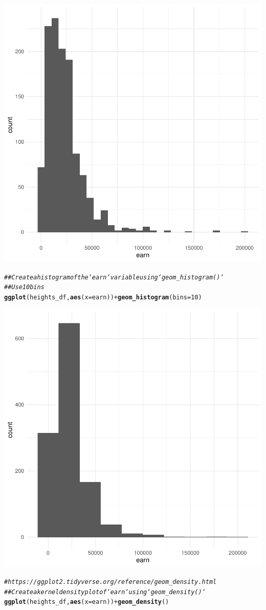 \documentclass{article}\usepackage[]{graphicx}\usepackage[]{xcolor}
\makeatletter
\newcommand{\hlnum}[1]{\textcolor[rgb]{0.686,0.059,0.569}{#1}}%
\newcommand{\hlcom}[1]{\textcolor[rgb]{0.678,0.584,0.686}{\textit{#1}}}%
\newcommand{\hlopt}[1]{\textcolor[rgb]{0,0,0}{#1}}%
\newcommand{\hlstd}[1]{\textcolor[rgb]{0.345,0.345,0.345}{#1}}%
\newcommand{\hlkwc}[1]{\textcolor[rgb]{0.333,0.667,0.333}{#1}}%
\newcommand{\hlkwd}[1]{\textcolor[rgb]{0.737,0.353,0.396}{\textbf{#1}}}%
\newenvironment{kframe}{%
 \def\at@end@of@kframe{}%
 \ifinner\ifhmode%
  \def\at@end@of@kframe{\end{minipage}}%
  \begin{minipage}{\columnwidth}%
 \fi\fi%
 \def\FrameCommand##1{\hskip\@totalleftmargin \hskip-\fboxsep
 \colorbox{shadecolor}{##1}\hskip-\fboxsep
     \hskip-\linewidth \hskip-\@totalleftmargin \hskip\columnwidth}%
 \MakeFramed {\advance\hsize-\width
   \@totalleftmargin\z@ \linewidth\hsize
   \@setminipage}}%
 {\par\unskip\endMakeFramed%
 \at@end@of@kframe}
\newenvironment{knitrout}{}{} %
\makeatother
\begin{document}
\begin{knitrout}
{\centering \includegraphics[width=.6\linewidth]{figure/assignment-03-Reppeto-Brian-Rnwauto-report-9} 

}


\begin{kframe}\begin{alltt}
\hlcom{## Create a histogram of the `earn` variable using `geom_histogram()`}
\hlcom{## Use 10 bins}
\hlkwd{ggplot}\hlstd{(heights_df,} \hlkwd{aes}\hlstd{(}\hlkwc{x}\hlstd{=earn))} \hlopt{+} \hlkwd{geom_histogram}\hlstd{(}\hlkwc{bins} \hlstd{=} \hlnum{10}\hlstd{)}
\end{alltt}
\end{kframe}

{\centering \includegraphics[width=.6\linewidth]{figure/assignment-03-Reppeto-Brian-Rnwauto-report-10} 

}


\begin{kframe}\begin{alltt}
\hlcom{# https://ggplot2.tidyverse.org/reference/geom_density.html}
\hlcom{## Create a kernel density plot of `earn` using `geom_density()`}
\hlkwd{ggplot}\hlstd{(heights_df,} \hlkwd{aes}\hlstd{(}\hlkwc{x}\hlstd{=earn))} \hlopt{+}  \hlkwd{geom_density}\hlstd{()}
\end{alltt}
\end{kframe}


\end{knitrout}
\end{document}
